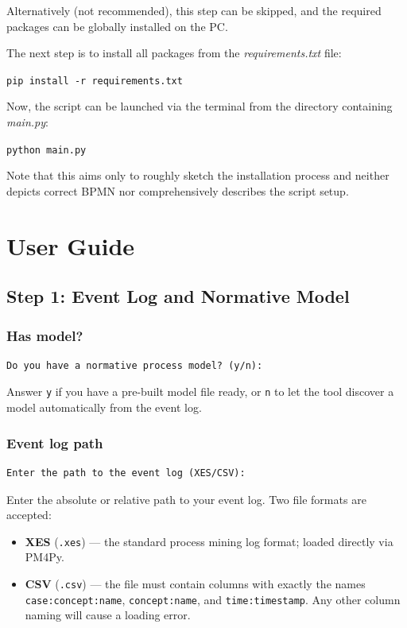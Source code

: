 \documentclass[12pt,a4paper]{article}
\begin{document}
Alternatively (not recommended), this step can be skipped, and the required packages can be globally installed on the PC.

The next step is to install all packages from the \textit{requirements.txt} file:
\begin{center}
\texttt{pip install -r requirements.txt}
\end{center}

Now, the script can be launched via the terminal from the directory containing \textit{main.py}:
\begin{center}
\texttt{python main.py}
\end{center}

Note that this aims only to roughly sketch the installation process and neither depicts correct BPMN nor comprehensively describes the script setup.

\section{User Guide}

\subsection{Step 1: Event Log and Normative Model}

\subsubsection{Has model?}
\begin{verbatim}
Do you have a normative process model? (y/n):
\end{verbatim}
Answer \texttt{y} if you have a pre-built model file ready, or \texttt{n} to let the tool discover a model automatically from the event log.

\subsubsection{Event log path}
\begin{verbatim}
Enter the path to the event log (XES/CSV):
\end{verbatim}
Enter the absolute or relative path to your event log. Two file formats are accepted:
\begin{itemize}
    \item \textbf{XES} (\texttt{.xes}) --- the standard process mining log format; loaded directly via PM4Py.
    \item \textbf{CSV} (\texttt{.csv}) --- the file must contain columns with exactly the names \verb|case:concept:name|, \verb|concept:name|, and \verb|time:timestamp|. Any other column naming will cause a loading error.
\end{itemize}
\end{document}
